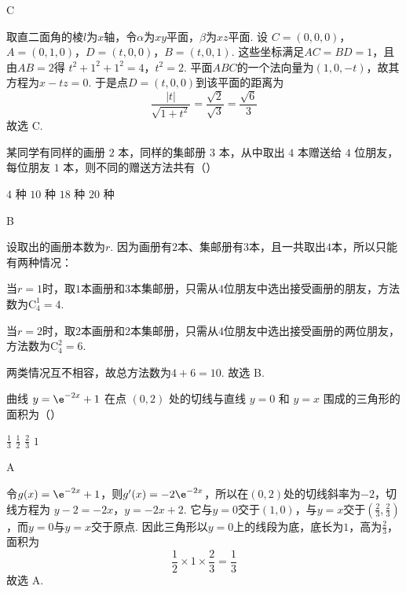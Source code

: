 \begin{answer}
C
\end{answer}

\begin{solution}
取直二面角的棱\(l\)为\(x\)轴，令\(\alpha\)为\(xy\)平面，\(\beta\)为\(xz\)平面. 设
\(C=(0,0,0)\)，\(A=(0,1,0)\)，\(D=(t,0,0)\)，\(B=(t,0,1)\).
这些坐标满足\(AC=BD=1\)，且由\(AB=2\)得
\(t^2+1^2+1^2=4\)，\(t^2=2\).
平面\(ABC\)的一个法向量为\((1,0,-t)\)，故其方程为\(x-tz=0\). 于是点\(D=(t,0,0)\)到该平面的距离为
\[
\frac{|t|}{\sqrt{1+t^2}}=\frac{\sqrt2}{\sqrt3}=\frac{\sqrt6}{3}
\]
故选 C.
\end{solution}


\begin{problem}
某同学有同样的画册 \(2\) 本，同样的集邮册 \(3\) 本，从中取出 \(4\) 本赠送给 \(4\) 位朋友，每位朋友 \(1\) 本，则不同的赠送方法共有（\quad）

\choices
    {\(4\) 种}
    {\(10\) 种}
    {\(18\) 种}
    {\(20\) 种}
\end{problem}

\begin{answer}
B
\end{answer}

\begin{solution}
设取出的画册本数为\(r\). 因为画册有\(2\)本、集邮册有\(3\)本，且一共取出\(4\)本，所以只能有两种情况：

当\(r=1\)时，取\(1\)本画册和\(3\)本集邮册，只需从\(4\)位朋友中选出接受画册的朋友，方法数为\(\mathrm C_4^1=4\).

当\(r=2\)时，取\(2\)本画册和\(2\)本集邮册，只需从\(4\)位朋友中选出接受画册的两位朋友，方法数为\(\mathrm C_4^2=6\).

两类情况互不相容，故总方法数为\(4+6=10\). 故选 B.
\end{solution}


\begin{problem}
曲线 \( y = \e^{-2x} + 1 \) 在点 \((0,2)\) 处的切线与直线 \( y = 0 \) 和 \( y = x \) 围成的三角形的面积为（\quad）

\choices
    {\(\frac{1}{3}\)}
    {\(\frac{1}{2}\)}
    {\(\frac{2}{3}\)}
    {\(1\)}
\end{problem}

\begin{answer}
A
\end{answer}

\begin{solution}
令\(g(x)=\e^{-2x}+1\)，则\(g'(x)=-2\e^{-2x}\)，所以在\((0,2)\)处的切线斜率为\(-2\)，切线方程为
\(y-2=-2x\)，\(y=-2x+2\).
它与\(y=0\)交于\((1,0)\)，与\(y=x\)交于\(\left(\frac23,\frac23\right)\)，而\(y=0\)与\(y=x\)交于原点. 因此三角形以\(y=0\)上的线段为底，底长为\(1\)，高为\(\frac23\)，面积为
\[
\frac12\times1\times\frac23=\frac13
\]
故选 A.
\end{solution}


